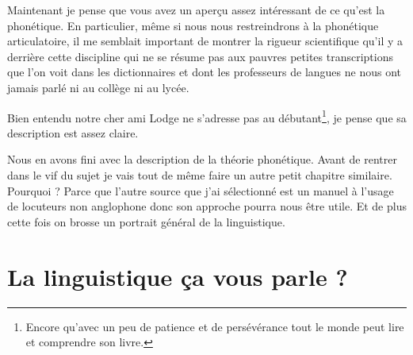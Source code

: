 Maintenant je pense que vous avez un aperçu assez intéressant de ce
qu'est la phonétique. En particulier, même si nous nous restreindrons
à la phonétique articulatoire, il me semblait important de montrer la
rigueur scientifique qu'il y a derrière cette discipline qui ne se
résume pas aux pauvres petites transcriptions que l'on voit dans les
dictionnaires et dont les professeurs de langues ne nous ont jamais
parlé ni au collège ni au lycée.

Bien entendu notre cher ami Lodge ne s'adresse pas au
débutant\footnote{Encore qu'avec un peu de patience et de persévérance
tout le monde peut lire et comprendre son livre.}, je pense que sa
description est assez claire.

Nous en avons fini avec la description de la théorie phonétique. Avant
de rentrer dans le vif du sujet je vais tout de même faire un autre
petit chapitre similaire. Pourquoi ? Parce que l'autre source que j'ai
sélectionné est un manuel à l'usage de locuteurs non anglophone donc
son approche pourra nous être utile. Et de plus cette fois on brosse
un portrait général de la linguistique.

\chapter{La linguistique ça vous parle ?}\label{chap:linguistic}


